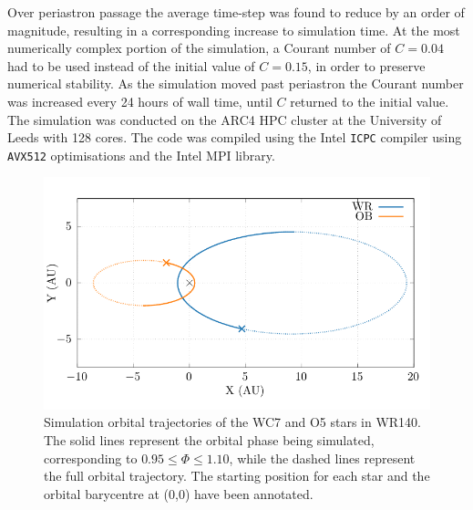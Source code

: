 \documentclass[fleqn,usenatbib]{mnras}
\begin{document}
Over periastron passage the average time-step was found to reduce by an order of magnitude, resulting in a corresponding increase to simulation time. %
At the most numerically complex portion of the simulation, a Courant number of $C = 0.04$ had to be used instead of the initial value of $C = 0.15$, in order to preserve numerical stability.
As the simulation moved past periastron the Courant number was increased every 24 hours of wall time, until $C$ returned to the initial value.
The simulation was conducted on the ARC4 HPC cluster at the University of Leeds with 128 cores.
The code was compiled using the Intel \texttt{ICPC} compiler using \texttt{AVX512} optimisations and the Intel MPI library.

\begin{figure}
  \centering
  \includegraphics[width=\linewidth]{assets/trajectory/wr140-orbit.pdf}
  \caption[Simulation orbital trajectories of WR140 WC7 and O5 stars]{Simulation orbital trajectories of the WC7 and O5 stars in WR140. The solid lines represent the orbital phase being simulated, corresponding to $0.95 \leq \Phi \leq 1.10$, while the dashed lines represent the full orbital trajectory. The starting position for each star and the orbital barycentre at (0,0) have been annotated.}
  \label{fig:p2-trajectory}
\end{figure}
\end{document}
